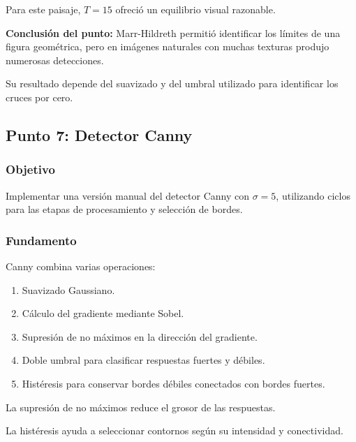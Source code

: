 \documentclass[11pt,letterpaper]{article}
\begin{document}
Para este paisaje, $T=15$ ofreció
un equilibrio visual razonable.

\textbf{Conclusión del punto:}
Marr-Hildreth permitió identificar
los límites de una figura geométrica,
pero en imágenes naturales con muchas
texturas produjo numerosas detecciones.

Su resultado depende del suavizado
y del umbral utilizado para identificar
los cruces por cero.

\subsection{Punto 7: Detector Canny}

\subsubsection*{Objetivo}

Implementar una versión manual del
detector Canny con $\sigma=5$,
utilizando ciclos para las etapas
de procesamiento y selección de bordes.

\subsubsection*{Fundamento}

Canny combina varias operaciones:

\begin{enumerate}

    \item Suavizado Gaussiano.

    \item Cálculo del gradiente
    mediante Sobel.

    \item Supresión de no máximos
    en la dirección del gradiente.

    \item Doble umbral para clasificar
    respuestas fuertes y débiles.

    \item Histéresis para conservar
    bordes débiles conectados
    con bordes fuertes.

\end{enumerate}

La supresión de no máximos reduce
el grosor de las respuestas.

La histéresis ayuda a seleccionar
contornos según su intensidad
y conectividad.
\end{document}
